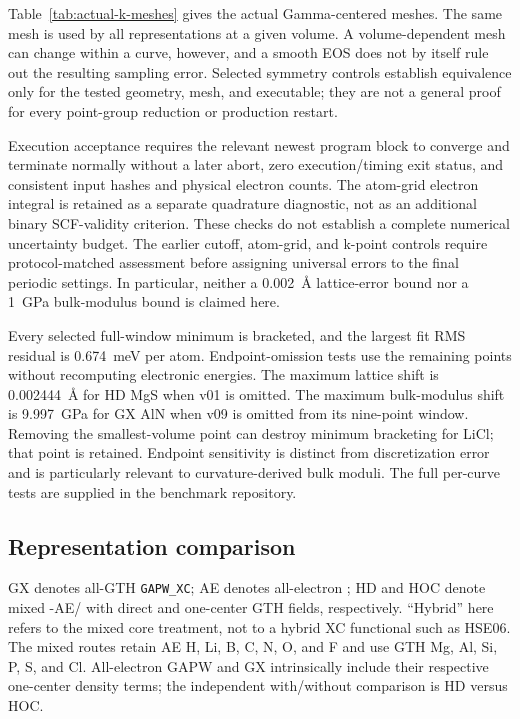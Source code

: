 Table~\ref{tab:actual-k-meshes} gives the actual Gamma-centered meshes. The same mesh is used by all representations at a given volume. A volume-dependent mesh can change within a curve, however, and a smooth EOS does not by itself rule out the resulting sampling error. Selected symmetry controls establish equivalence only for the tested geometry, mesh, and executable; they are not a general proof for every point-group reduction or production restart.

Execution acceptance requires the relevant newest program block to converge and terminate normally without a later abort, zero execution/timing exit status, and consistent input hashes and physical electron counts. The atom-grid electron integral is retained as a separate quadrature diagnostic, not as an additional binary SCF-validity criterion. These checks do not establish a complete numerical uncertainty budget. The earlier cutoff, atom-grid, and k-point controls require protocol-matched assessment before assigning universal errors to the final periodic settings. In particular, neither a 0.002~\AA{} lattice-error bound nor a 1~GPa bulk-modulus bound is claimed here.

Every selected full-window minimum is bracketed, and the largest fit RMS residual is 0.674~meV per atom. Endpoint-omission tests use the remaining points without recomputing electronic energies. The maximum lattice shift is 0.002444~\AA{} for HD MgS when v01 is omitted. The maximum bulk-modulus shift is 9.997~GPa for GX AlN when v09 is omitted from its nine-point window. Removing the smallest-volume point can destroy minimum bracketing for LiCl; that point is retained. Endpoint sensitivity is distinct from discretization error and is particularly relevant to curvature-derived bulk moduli. The full per-curve tests are supplied in the benchmark repository.

\subsection{Representation comparison}

GX denotes all-GTH \texttt{GAPW\_XC}; AE denotes all-electron \GAPW{}; HD and HOC denote mixed \GAPW{}-AE/\GTH{} with direct and one-center GTH fields, respectively. ``Hybrid'' here refers to the mixed core treatment, not to a hybrid XC functional such as HSE06. The mixed routes retain AE H, Li, B, C, N, O, and F and use GTH Mg, Al, Si, P, S, and Cl. All-electron GAPW and GX intrinsically include their respective one-center density terms; the independent with/without comparison is HD versus HOC.

